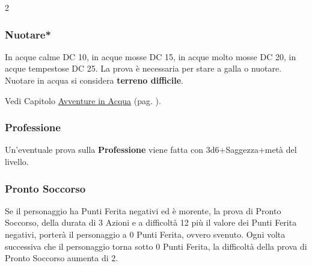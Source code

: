 \begin{multicols}{2}
\titlespacing*{\subsubsection}{0pt}{0.5em}{0.5em}\subsubsection*{Nuotare*}\label{compnuotare}

In acque calme DC 10, in acque mosse DC 15, in acque molto mosse DC 20, in acque tempestose DC 25. La prova è necessaria per stare a galla o nuotare. Nuotare in acqua si considera \textbf{terreno difficile}.

Vedi Capitolo \hyperlink{combatteresottacqua}{Avventure in Acqua} (pag. \pageref{combatteresottacqua}).

\titlespacing*{\subsubsection}{0pt}{0.5em}{0.5em}\subsubsection*{Professione}
Un'eventuale prova sulla \textbf{Professione} viene fatta con 3d6+Saggezza+metà del livello.


\titlespacing*{\subsubsection}{0pt}{0.5em}{0.5em}\subsubsection*{Pronto Soccorso}\hypertarget{prontosoccorso}{}\label{prontosoccorso}

Se il personaggio ha Punti Ferita negativi ed è morente, la prova di Pronto Soccorso, della durata di 3 Azioni e a difficoltà 12 più il valore dei Punti Ferita negativi, porterà il personaggio a 0 Punti Ferita, ovvero svenuto. Ogni volta successiva che il personaggio torna sotto 0 Punti Ferita, la difficoltà della prova di Pronto Soccorso aumenta di 2.


\end{multicols}
